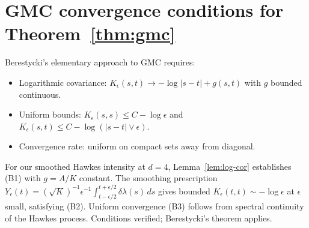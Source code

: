 \documentclass[11pt,a4paper]{article}
\begin{document}
\section{GMC convergence conditions for Theorem~\ref{thm:gmc}}
\label{app:gmc-conditions}

Berestycki's elementary approach to GMC \cite{Berestycki2017} requires:
\begin{itemize}
\item[(B1)] Logarithmic covariance: $K_\epsilon(s,t) \to -\log|s-t| + g(s,t)$ with $g$ bounded continuous.
\item[(B2)] Uniform bounds: $K_\epsilon(s,s) \leq C - \log\epsilon$ and $K_\epsilon(s,t) \leq C - \log(|s-t| \vee \epsilon)$.
\item[(B3)] Convergence rate: uniform on compact sets away from diagonal.
\end{itemize}

For our smoothed Hawkes intensity at $d = 4$, Lemma~\ref{lem:log-cor} establishes (B1) with $g = A/K$ constant. The smoothing prescription $Y_\epsilon(t) = (\sqrt{K})^{-1}\epsilon^{-1}\int_{t-\epsilon/2}^{t+\epsilon/2}\delta\lambda(s)\,ds$ gives bounded $K_\epsilon(t,t) \sim -\log\epsilon$ at $\epsilon$ small, satisfying (B2). Uniform convergence (B3) follows from spectral continuity of the Hawkes process. Conditions verified; Berestycki's theorem applies.
\end{document}

